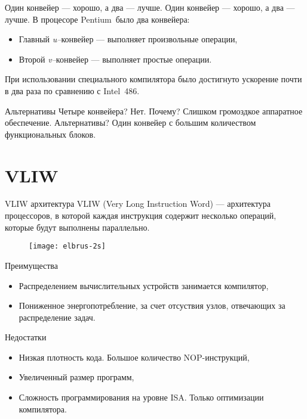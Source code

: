 \begin{frame}{Один конвейер --- хорошо, а два --- лучше.}
Один конвейер --- хорошо, а два --- лучше.
\vfill\pause
В процесоре Pentium\textsuperscript\textregistered~было два конвейера:
\begin{itemize}
    \item Главный \textit{u--}конвейер --- выполняет произвольные операции,
    \item Второй \textit{v--}конвейер --- выполняет простые операции.
\end{itemize}
\vfill\pause
При использовании специального компилятора было достигнуто ускорение почти в два
раза по сравнению с Intel\textsuperscript\textregistered~486.
\end{frame}

\begin{frame}{Альтернативы}
Четыре конвейера?
\vfill\pause
Нет. Почему?
\vfill\pause
Слишком громоздкое аппаратное обеспечение. Альтернативы?
\vfill\pause
Один конвейер с большим количеством функциональных блоков.
\end{frame}

\section{VLIW}

\begin{frame}{VLIW архитектура}
VLIW (Very Long Instruction Word) --- архитектура процессоров, в которой каждая
инструкция содержит несколько операций, которые будут выполнены параллельно.

\begin{figure}[htpb]
    \texttt{[image: elbrus-2s]}
\end{figure}
\end{frame}

\begin{frame}{Преимущества}
\begin{itemize}
    \item Распределением вычислительных устройств занимается компилятор,
    \item Пониженное энергопотребление, за счет отсуствия узлов, отвечающих за
    распределение задач.
\end{itemize}
\end{frame}

\begin{frame}{Недостатки}
\begin{itemize}
    \item Низкая плотность кода. Большое количество NOP-инструкций,
    \item Увеличенный размер программ,
    \item Сложность программирования на уровне ISA. Только оптимизации
    компилятора.
\end{itemize}
\end{frame}

